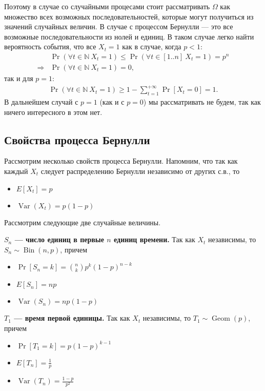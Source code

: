 \documentclass[12pt]{article}
\newcommand\N{\mathbb{N}}
\DeclareMathOperator{\Bin}{Bin}
\DeclareMathOperator{\Geom}{Geom}
\DeclareMathOperator{\Var}{Var}
\begin{document}
Поэтому в случае со случайными процесами стоит рассматривать $\Omega$ как множество всех возможных последовательностей, которые могут получиться из значений случайных величин. В случае с процессом Бернулли --- это все возможные последовательности из нолей и единиц. В таком случае легко найти вероятность события, что все $X_t = 1$ как в случае, когда $p < 1$:
\begin{align*}
  &\Pr(\forall t\in \N \ X_t = 1) \le \Pr(\forall t\in [1..n] \ X_t = 1) = p^n \\
  \Rightarrow& \Pr(\forall t\in \N \ X_t = 1) = 0,
\end{align*}
так и для $p = 1$:
\begin{align*}
  \Pr(\forall t\in \N \ X_t = 1) \ge 1 - \sum_{t = 1}^{+\infty} \Pr[X_t = 0] = 1.
\end{align*}
В дальнейшем случай с $p = 1$ (как и с $p = 0$) мы рассматривать не будем, так как ничего интересного в этом нет.

\subsection{Свойства процесса Бернулли}
Рассмотрим несколько свойств процесса Бернулли. Напомним, что так как каждый $X_t$ следует распределению Бернулли независимо от других с.в., то
\begin{itemize}
  \item $E[X_t] = p$
  \item $\Var(X_t) = p(1-p)$
\end{itemize}

Рассмотрим следующие две случайные величины.

\textbf{$S_n$ --- число единиц в первые $n$ единиц времени.} Так как $X_t$ независимы, то $S_n \sim \Bin(n, p)$, причем
\begin{itemize}
  \item $\Pr[S_n = k] = \binom{n}{k} p^k (1 - p)^{n - k}$
  \item $E[S_n] = np$
  \item $\Var(S_n) = np(1 - p)$
\end{itemize} 

\textbf{$T_1$ --- время первой единицы.} Так как $X_t$ независимы, то $T_1 \sim \Geom(p)$, причем
\begin{itemize}
  \item $\Pr[T_1 = k] = p (1 - p)^{k - 1}$
  \item $E[T_n] = \frac{1}{p}$
  \item $\Var(T_n) = \frac{1 - p}{p^2}$
\end{itemize} 
\end{document}
